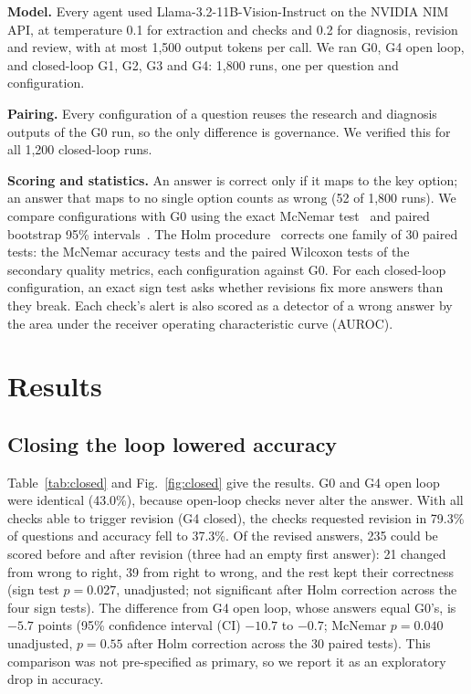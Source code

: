 \documentclass[conference]{IEEEtran}
\begin{document}
\textbf{Model.} Every agent used Llama-3.2-11B-Vision-Instruct on the NVIDIA NIM API,
at temperature 0.1 for extraction and checks and 0.2 for diagnosis, revision and review, with at %
most 1{,}500 output tokens per call. We ran G0, G4 open loop, and closed-loop G1, G2, G3 and G4: 1,800 runs, one per
question and configuration.

\textbf{Pairing.} Every configuration of a question reuses the research and diagnosis outputs of the G0 run, so the
only difference is governance. We verified this for all 1,200 closed-loop runs.

\textbf{Scoring and statistics.} An answer is correct only if it maps to the key option; an answer that maps to no
single option counts as wrong (52 of 1,800 runs). We compare configurations with G0 using the exact McNemar
test~\cite{mcnemar1947note} and paired bootstrap 95\% intervals~\cite{efron1979bootstrap}. The Holm
procedure~\cite{holm1979simple} corrects one family of 30 paired tests: the McNemar accuracy tests and the paired
Wilcoxon tests of the secondary quality metrics, each configuration against G0. For each closed-loop configuration, an
exact sign test asks whether revisions fix more answers than they break. Each check's alert is also scored as a
detector of a wrong answer by the area under the receiver operating characteristic curve (AUROC).

\section{Results}
\subsection{Closing the loop lowered accuracy}
Table~\ref{tab:closed} and Fig.~\ref{fig:closed} give the results. G0 and G4 open loop were identical (43.0\%), because
open-loop checks never alter the answer. With all checks able to trigger revision (G4 closed), the checks requested
revision in 79.3\% of questions and accuracy fell to 37.3\%. Of the revised answers, 235 could be scored before and
after revision (three had an empty first answer): 21 changed from wrong to right, 39 from right to wrong, and the rest
kept their correctness (sign test $p = 0.027$, unadjusted; not significant after Holm correction across the four sign
tests). The difference from G4 open loop, whose answers equal G0's, is $-5.7$ points (95\% confidence interval (CI)
$-10.7$ to $-0.7$; McNemar $p = 0.040$ unadjusted, $p = 0.55$ after Holm correction across the 30 paired tests). This
comparison was not pre-specified as primary, so we report it as an exploratory drop in accuracy.
\end{document}
